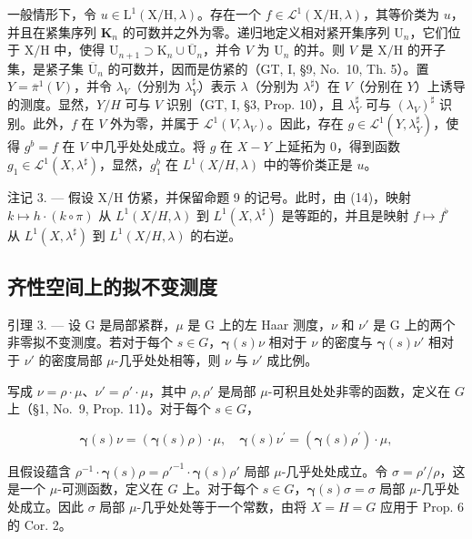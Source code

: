 一般情形下，令 \(u \in \mathrm{L}^1(\mathrm{X/H},\lambda)\)。存在一个 \(f \in \mathcal{L}^1(\mathrm{X/H},\lambda)\)，其等价类为 \(u\)，并且在紧集序列 \(\mathbf{K}_n\) 的可数并之外为零。递归地定义相对紧开集序列 \(\mathrm{U}_n\)，它们位于 \(\mathrm{X/H}\) 中，使得 \(\mathrm{U}_{n+1} \supset \mathrm{K}_n \cup \overline{\mathrm{U}}_n\)，并令 \(V\) 为 \(\mathrm{U}_n\) 的并。则 \(V\) 是 \(\mathrm{X/H}\) 的开子集，是紧子集 \(\overline{\mathrm{U}}_n\) 的可数并，因而是仿紧的（GT, I, §9, No.~10, Th. 5）。置 \(Y = \overline{\pi}^1(V)\)，并令 \(\lambda_V\)（分别为 \(\lambda_Y^\sharp\)）表示 \(\lambda\)（分别为 \(\lambda^\sharp\)）在 \(V\)（分别在 \(Y\)）上诱导的测度。显然，\(Y/H\) 可与 \(V\) 识别（GT, I, §3, Prop. 10），且 \(\lambda_Y^\sharp\) 可与 \((\lambda_V)^{\sharp}\) 识别。此外，\(f\) 在 \(V\) 外为零，并属于 \(\mathcal{L}^1(V,\lambda_V)\)。因此，存在 \(g \in \mathcal{L}^1(Y,\lambda_Y^\sharp)\)，使得 \(g^b = f\) 在 \(V\) 中几乎处处成立。将 \(g\) 在 \(X - Y\) 上延拓为 0，得到函数 \(g_1 \in \mathcal{L}^1(X,\lambda^\sharp)\)，显然，\(g_1^b\) 在 \(L^1(X/H,\lambda)\) 中的等价类正是 \(u\)。

注记 3. --- 假设 X/H 仿紧，并保留命题 9 的记号。此时，由 (14)，映射 \(k \mapsto h \cdot (k \circ \pi)\) 从 \(L^1(X/H, \lambda)\) 到 \(L^1(X, \lambda^\sharp)\) 是等距的，并且是映射 \(f \mapsto f^\flat\) 从 \(L^1(X, \lambda^\sharp)\) 到 \(L^1(X/H, \lambda)\) 的右逆。

\subsection{齐性空间上的拟不变测度}

引理 3. --- 设 G 是局部紧群，\(\mu\) 是 G 上的左 Haar 测度，\(\nu\) 和 \(\nu'\) 是 G 上的两个非零拟不变测度。若对于每个 \(s \in G\)，\(\boldsymbol{\gamma}(s)\nu\) 相对于 \(\nu\) 的密度与 \(\boldsymbol{\gamma}(s)\nu'\) 相对于 \(\nu'\) 的密度局部 \(\mu\)-几乎处处相等，则 \(\nu\) 与 \(\nu'\) 成比例。

写成 \(\nu = \rho \cdot \mu\)、\(\nu' = \rho' \cdot \mu\)，其中 \(\rho, \rho'\) 是局部 \(\mu\)-可积且处处非零的函数，定义在 \(G\) 上（§1, No.~9, Prop. 11）。对于每个 \(s \in G\)，

\[
\boldsymbol {\gamma} (s) \nu = (\boldsymbol {\gamma} (s) \rho) \cdot \mu , \quad \boldsymbol {\gamma} (s) \nu^ {\prime} = (\boldsymbol {\gamma} (s) \rho^ {\prime}) \cdot \mu ,
\]

且假设蕴含 \(\rho^{-1} \cdot \pmb{\gamma}(s) \rho = \rho'^{-1} \cdot \pmb{\gamma}(s) \rho'\) 局部 \(\mu\)-几乎处处成立。令 \(\sigma = \rho'/\rho\)，这是一个 \(\mu\)-可测函数，定义在 \(G\) 上。对于每个 \(s \in G\)，\(\pmb{\gamma}(s) \sigma = \sigma\) 局部 \(\mu\)-几乎处处成立。因此 \(\sigma\) 局部 \(\mu\)-几乎处处等于一个常数，由将 \(X = H = G\) 应用于 Prop. 6 的 Cor. 2。

